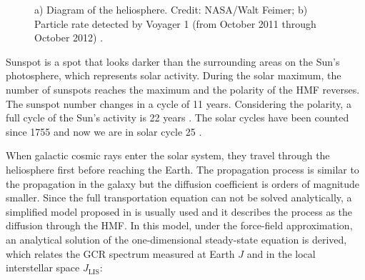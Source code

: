 \begin{figure} \centering   
{}    
\caption[Heliosphere and Particle rate detected by Voyager 1.]{a) Diagram of the heliosphere. Credit: NASA/Walt Feimer; b) Particle rate detected by Voyager 1 (from October 2011 through October 2012) \cite{WikiVoyager1ReachHeliosphere}.}     
\end{figure}

Sunspot is a spot that looks darker than the surrounding areas on the Sun's photosphere, which represents solar activity. During the solar maximum, the number of sunspots reaches the maximum and the polarity of the HMF reverses. The sunspot number changes in a cycle of 11 years. Considering the polarity, a full cycle of the Sun's activity is 22 years \cite{SolarCycle}. The solar cycles have been counted since 1755 and now we are in solar cycle 25 \cite{SolarCycleFirstObservation1, SolarCycleFirstObservation2}. \par


When galactic cosmic rays enter the solar system, they travel through the heliosphere first before reaching the Earth. The propagation process is similar to the propagation in the galaxy but the diffusion coefficient is orders of magnitude smaller. Since the full transportation equation can not be solved analytically, a simplified model proposed in \cite{ForceFieldApproximationPaper} is usually used and it describes the process as the diffusion through the HMF. In this model, under the force-field approximation, an analytical solution of the one-dimensional steady-state equation is derived, which relates the GCR spectrum measured at Earth $J$ and in the local interstellar space  $J_\mathrm{LIS}$:  

